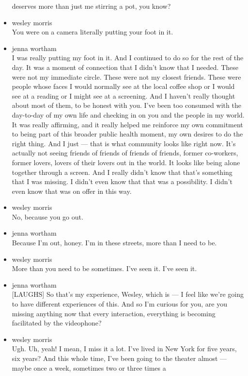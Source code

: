 \begin{itemize}
  deserves more than just me stirring a pot, you know?
\item
  wesley morris\\
  You were on a camera literally putting your foot in it.
\item
  jenna wortham\\
  I was really putting my foot in it. And I continued to do so for the
  rest of the day. It was a moment of connection that I didn't know that
  I needed. These were not my immediate circle. These were not my
  closest friends. These were people whose faces I would normally see at
  the local coffee shop or I would see at a reading or I might see at a
  screening. And I haven't really thought about most of them, to be
  honest with you. I've been too consumed with the day-to-day of my own
  life and checking in on you and the people in my world. It was really
  affirming, and it really helped me reinforce my own commitment to
  being part of this broader public health moment, my own desires to do
  the right thing. And I just --- that is what community looks like
  right now. It's actually not seeing friends of friends of friends of
  friends, former co-workers, former lovers, lovers of their lovers out
  in the world. It looks like being alone together through a screen. And
  I really didn't know that that's something that I was missing. I
  didn't even know that that was a possibility. I didn't even know that
  was on offer in this way.
\item
  wesley morris\\
  No, because you go out.
\item
  jenna wortham\\
  Because I'm out, honey. I'm in these streets, more than I need to be.
\item
  wesley morris\\
  More than you need to be sometimes. I've seen it. I've seen it.
\item
  jenna wortham\\
  {[}LAUGHS{]} So that's my experience, Wesley, which is --- I feel like
  we're going to have different experiences of this. And so I'm curious
  for you, are you missing anything now that every interaction,
  everything is becoming facilitated by the videophone?
\item
  wesley morris\\
  Ugh. Uh, yeah! I mean, I miss it a lot. I've lived in New York for
  five years, six years? And this whole time, I've been going to the
  theater almost --- maybe once a week, sometimes two or three times a

\end{itemize}
